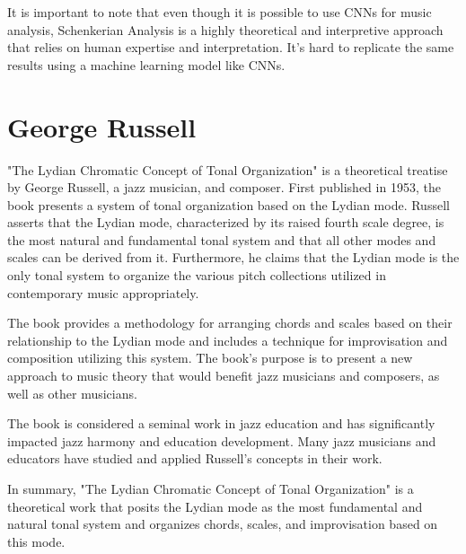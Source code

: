 It is important to note that even though it is possible to use CNNs for music analysis, Schenkerian Analysis is a highly theoretical and interpretive approach that relies on human expertise and interpretation. It's hard to replicate the same results using a machine learning model like CNNs.

\section{George Russell}

"The Lydian Chromatic Concept of Tonal Organization" is a theoretical treatise by George Russell, a jazz musician, and composer. First published in 1953, the book presents a system of tonal organization based on the Lydian mode. Russell asserts that the Lydian mode, characterized by its raised fourth scale degree, is the most natural and fundamental tonal system and that all other modes and scales can be derived from it. Furthermore, he claims that the Lydian mode is the only tonal system to organize the various pitch collections utilized in contemporary music appropriately.

The book provides a methodology for arranging chords and scales based on their relationship to the Lydian mode and includes a technique for improvisation and composition utilizing this system. The book's purpose is to present a new approach to music theory that would benefit jazz musicians and composers, as well as other musicians.

The book is considered a seminal work in jazz education and has significantly impacted jazz harmony and education development. Many jazz musicians and educators have studied and applied Russell's concepts in their work.

In summary, "The Lydian Chromatic Concept of Tonal Organization" is a theoretical work that posits the Lydian mode as the most fundamental and natural tonal system and organizes chords, scales, and improvisation based on this mode.